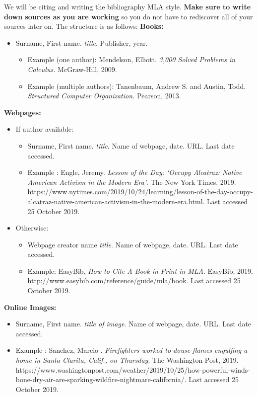 \documentclass{article}
\begin{document}
We will be citing and writing the bibliography MLA style. \textbf{Make sure to write down sources as you are working} so you do not have to rediscover all of your sources later on. The structure is as follows: \newline \medskip
\textbf{Books:}
\begin{itemize}
\item Surname, First name. \emph{title}. Publisher, year.
\begin{itemize}
\item Example (one author): Mendelson, Elliott. \emph{3,000 Solved Problems in Calculus.} McGraw-Hill, 2009.
\item Example (multiple authors): Tanenbaum, Andrew S. and Austin, Todd. \emph{Structured Computer Organization.} Pearson, 2013.
\end{itemize}
\end{itemize}

\noindent \textbf{Webpages:}
\begin{itemize} \medskip
\item If author available: 
\begin{itemize}
\item Surname, First name. \emph{title}. Name of webpage, date. URL. Last date accessed.
\item Example : Engle, Jeremy. \emph{Lesson of the Day: ‘Occupy Alcatraz: Native American Activism in the Modern Era’}. The New York Times, 2019. https://www.nytimes.com/2019/10/24/learning/lesson-of-the-day-occupy-alcatraz-native-american-activism-in-the-modern-era.html. Last accessed 25 October 2019.
\end{itemize}
\item Otherwise:
\begin{itemize}
\item Webpage creator name \emph{title}. Name of webpage, date. URL. Last date accessed.
\item Example: EasyBib, \emph{How to Cite A Book in Print in MLA}. EasyBib, 2019. http://www.easybib.com/reference/guide/mla/book. Last accessed 25 October 2019.
\end{itemize}
\end{itemize}

\noindent \textbf{Online Images:}
\begin{itemize} \medskip
\item Surname, First name. \emph{title of image}. Name of webpage, date. URL. Last date accessed.
\item Example : Sanchez, Marcio . \emph{Firefighters worked to douse flames engulfing a home in Santa Clarita, Calif., on Thursday}. The Washington Post, 2019. https://www.washingtonpost.com/weather/2019/10/25/how-powerful-winds-bone-dry-air-are-sparking-wildfire-nightmare-california/. Last accessed 25 October 2019.
\end{itemize}
\end{document}
